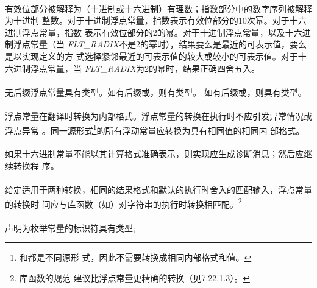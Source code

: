 {\semantic
\paragraph{}
有效位部分被解释为（十进制或十六进制）有理数；指数部分中的数字序列被解释为十进制
整数。对于十进制浮点常量，指数表示有效位部分的10次幂。对于十六进制浮点常量，指数
表示有效位部分的2的幂。对于十进制浮点常量，以及十六进制浮点常量（当
\textit{FLT\_RADIX}不是2的幂时），结果要么是最近的可表示值，要么是以实现定义的方
式选择紧邻最近的可表示值的较大或较小的可表示值。对于十六进制浮点常量，当
\textit{FLT\_RADIX}为2的幂时，结果正确四舍五入。

\paragraph{}
无后缀浮点常量具有类型。如有后缀或，则有类型。
如有后缀或，则具有类型。

\paragraph{}
浮点常量在翻译时转换为内部格式。浮点常量的转换在执行时不应引发异常情况或浮点异常
。同一源形式\footnote{和都是不同源形
式，因此不需要转换成相同内部格式和值。}的所有浮动常量应转换为具有相同值的相同内
部格式。

\recprac
\paragraph{}
如果十六进制常量不能以其计算格式准确表示，则实现应生成诊断消息；然后应继续转换程
序。

\paragraph{}
给定适用于两种转换，相同的结果格式和默认的执行时舍入的匹配输入，浮点常量的转换时
间应与库函数（如）对字符串的执行时转换相匹配。\footnote{库函数的规范
建议比浮点常量更精确的转换（见7.22.1.3）。}

\syntax
\paragraph{}

\semantic
\paragraph{}
声明为枚举常量的标识符具有类型;

}
